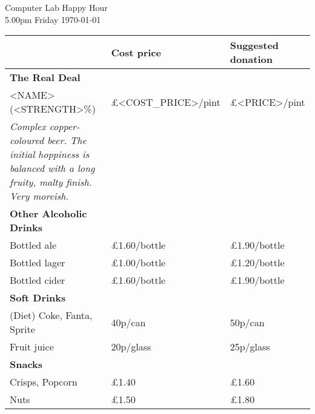 \documentclass[a4paper,12pt]{article}
\begin{document}
\thispagestyle{empty}

\begin{center}
    {\Large Computer Lab Happy Hour} \\ \smallskip
    {5.00pm Friday \today}
\end{center}

\bigskip

\large
\begin{center}

\def\arraystretch{1.1}

\begin{tabular}{p{7.5cm}|p{3cm}|p{3cm}}
 & \textbf{Cost price} & \textbf{Suggested donation} \\
\hline
\textbf{The Real Deal} & & \\

<NAME> (<STRENGTH>\%) & \pounds <COST_PRICE>/pint & \pounds <PRICE>/pint \\

\small \it Complex copper-coloured beer. The initial hoppiness is balanced with a long fruity, malty finish. Very moreish. & &
\\

\hline
{\bf Other Alcoholic Drinks} & & \\
Bottled ale & \pounds 1.60/bottle & \pounds 1.90/bottle \\
Bottled lager & \pounds 1.00/bottle & \pounds 1.20/bottle \\
Bottled cider & \pounds 1.60/bottle & \pounds 1.90/bottle \\

\hline
{\bf Soft Drinks} &&\\
(Diet) Coke, Fanta, Sprite & 40p/can  & 50p/can\\
Fruit juice & 20p/glass & 25p/glass\\

\hline
{\bf Snacks} & & \\
Crisps, Popcorn &\pounds 1.40   &\pounds 1.60 \\
Nuts &\pounds 1.50 &\pounds 1.80\\

\end{tabular}
\end{center}
\end{document}

